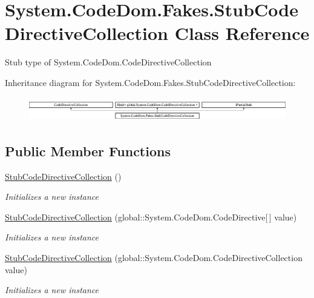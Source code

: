 \hypertarget{class_system_1_1_code_dom_1_1_fakes_1_1_stub_code_directive_collection}{\section{System.\-Code\-Dom.\-Fakes.\-Stub\-Code\-Directive\-Collection Class Reference}
\label{class_system_1_1_code_dom_1_1_fakes_1_1_stub_code_directive_collection}
}


Stub type of System.\-Code\-Dom.\-Code\-Directive\-Collection 


Inheritance diagram for System.\-Code\-Dom.\-Fakes.\-Stub\-Code\-Directive\-Collection\-:\begin{figure}[H]
\begin{center}
\leavevmode
\includegraphics[height=1.066667cm]{class_system_1_1_code_dom_1_1_fakes_1_1_stub_code_directive_collection}
\end{center}
\end{figure}
\subsection*{Public Member Functions}
\begin{DoxyCompactItemize}
\item 
\hyperlink{class_system_1_1_code_dom_1_1_fakes_1_1_stub_code_directive_collection_ae29216bcc4478d3f55d0d1157b4e30b6}{Stub\-Code\-Directive\-Collection} ()
\begin{DoxyCompactList}\small\item\em Initializes a new instance\end{DoxyCompactList}\item 
\hyperlink{class_system_1_1_code_dom_1_1_fakes_1_1_stub_code_directive_collection_a108d0802653c9c1705568056eb87682d}{Stub\-Code\-Directive\-Collection} (global\-::\-System.\-Code\-Dom.\-Code\-Directive\mbox{[}$\,$\mbox{]} value)
\begin{DoxyCompactList}\small\item\em Initializes a new instance\end{DoxyCompactList}\item 
\hyperlink{class_system_1_1_code_dom_1_1_fakes_1_1_stub_code_directive_collection_a4c6bb9d24d107a77c8fe71bb1c629649}{Stub\-Code\-Directive\-Collection} (global\-::\-System.\-Code\-Dom.\-Code\-Directive\-Collection value)
\begin{DoxyCompactList}\small\item\em Initializes a new instance\end{DoxyCompactList}\end{DoxyCompactItemize}
